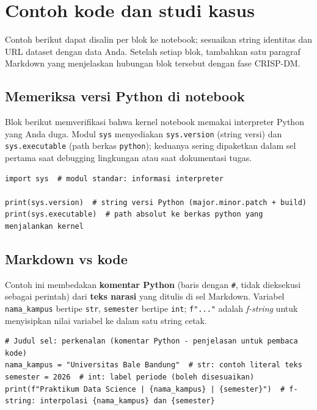 \documentclass[../main.tex]{subfiles}
\begin{document}


\section{Contoh kode dan studi kasus}

Contoh berikut dapat disalin per blok ke notebook; sesuaikan string identitas dan URL dataset dengan data Anda. Setelah setiap blok, tambahkan satu paragraf Markdown yang menjelaskan hubungan blok tersebut dengan fase CRISP-DM.

\subsection{Memeriksa versi Python di notebook}

\MulaiPenjelasanKode Blok berikut memverifikasi bahwa kernel notebook memakai interpreter Python yang Anda duga. Modul \texttt{sys} menyediakan \texttt{sys.version} (string versi) dan \texttt{sys.executable} (path berkas \texttt{python}); keduanya sering dipaketkan dalam sel pertama saat debugging lingkungan atau saat dokumentasi tugas. \SelesaiPenjelasanKode

\begin{lstlisting}[caption=Versi Python dan path executable]
import sys  # modul standar: informasi interpreter

print(sys.version)  # string versi Python (major.minor.patch + build)
print(sys.executable)  # path absolut ke berkas python yang menjalankan kernel
\end{lstlisting}

\subsection{Markdown vs kode}

\MulaiPenjelasanKode Contoh ini membedakan \textbf{komentar Python} (baris dengan \texttt{\#}, tidak dieksekusi sebagai perintah) dari \textbf{teks narasi} yang ditulis di sel Markdown. Variabel \texttt{nama\_kampus} bertipe \texttt{str}, \texttt{semester} bertipe \texttt{int}; \texttt{f"..."} adalah \textit{f-string} untuk menyisipkan nilai variabel ke dalam satu string cetak. \SelesaiPenjelasanKode

\begin{lstlisting}[caption=Operasi sederhana di sel kode]
# Judul sel: perkenalan (komentar Python - penjelasan untuk pembaca kode)
nama_kampus = "Universitas Bale Bandung"  # str: contoh literal teks
semester = 2026  # int: label periode (boleh disesuaikan)
print(f"Praktikum Data Science | {nama_kampus} | {semester}")  # f-string: interpolasi {nama_kampus} dan {semester}
\end{lstlisting}
\end{document}
